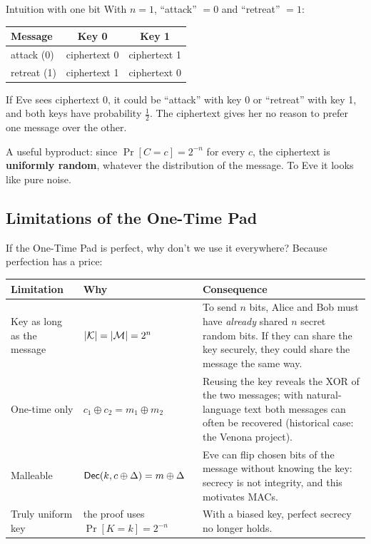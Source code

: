 \begin{framedex}{Intuition with one bit}
  With $n = 1$, ``attack'' $= 0$ and ``retreat'' $= 1$:
  \begin{center}
    \begin{tabular}{lcc}
      \toprule
      \textbf{Message} & \textbf{Key 0} & \textbf{Key 1} \\
      \midrule
      attack (0) & ciphertext 0 & ciphertext 1 \\
      retreat (1) & ciphertext 1 & ciphertext 0 \\
      \bottomrule
    \end{tabular}
  \end{center}
  If Eve sees ciphertext 0, it could be ``attack'' with key 0 or ``retreat'' with key 1, and both keys have probability $\frac{1}{2}$. The ciphertext gives her no reason to prefer one message over the other.
\end{framedex}

A useful byproduct: since $\Pr[C = c] = 2^{-n}$ for every $c$, the ciphertext is \textbf{uniformly random}, whatever the distribution of the message. To Eve it looks like pure noise.

\subsection{Limitations of the One-Time Pad}

If the One-Time Pad is perfect, why don't we use it everywhere? Because perfection has a price:

\begin{table}[H]
  \centering
  \small
  \begin{tabularx}{\textwidth}{@{}>{\raggedright\arraybackslash}p{2.9cm}>{\raggedright\arraybackslash}p{4.2cm}X@{}}
    \toprule
    \textbf{Limitation} & \textbf{Why} & \textbf{Consequence} \\
    \midrule
    Key as long as the message & $|\mathcal{K}| = |\mathcal{M}| = 2^n$ & To send $n$ bits, Alice and Bob must have \textit{already} shared $n$ secret random bits. If they can share the key securely, they could share the message the same way. \\
    One-time only & $c_1 \oplus c_2 = m_1 \oplus m_2$ & Reusing the key reveals the XOR of the two messages; with natural-language text both messages can often be recovered (historical case: the Venona project). \\
    Malleable & $\mathsf{Dec}(k, c \oplus \Delta) = m \oplus \Delta$ & Eve can flip chosen bits of the message without knowing the key: secrecy is not integrity, and this motivates MACs. \\
    Truly uniform key & the proof uses $\Pr[K = k] = 2^{-n}$ & With a biased key, perfect secrecy no longer holds. \\
    \bottomrule
  \end{tabularx}
\end{table}

